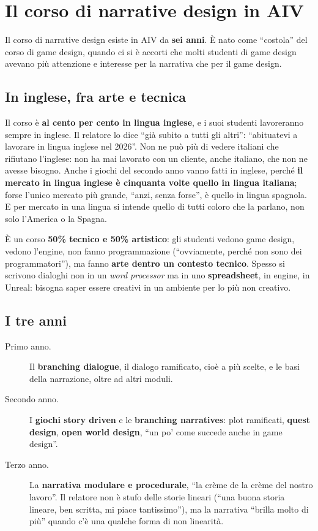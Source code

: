 \section{Il corso di narrative design in AIV}
\label{p3:sec:corso}

Il corso di narrative design esiste in AIV da \textbf{sei anni}. È nato come
``costola'' del corso di game design, quando ci si è accorti che molti
studenti di game design avevano più attenzione e interesse per la narrativa
che per il game design.

\subsection{In inglese, fra arte e tecnica}

Il corso è \textbf{al cento per cento in lingua inglese}, e i suoi studenti
lavoreranno sempre in inglese. Il relatore lo dice ``già subito a tutti gli
altri'': ``abituatevi a lavorare in lingua inglese nel 2026''. Non ne può più
di vedere italiani che rifiutano l'inglese: non ha mai lavorato con un
cliente, anche italiano, che non ne avesse bisogno. Anche i giochi del
secondo anno vanno fatti in inglese, perché \textbf{il mercato in lingua
inglese è cinquanta volte quello in lingua italiana}; forse l'unico mercato
più grande, ``anzi, senza forse'', è quello in lingua spagnola. E per mercato
in una lingua si intende quello di tutti coloro che la parlano, non solo
l'America o la Spagna.

È un corso \textbf{50\% tecnico e 50\% artistico}: gli studenti vedono game
design, vedono l'engine, non fanno programmazione (``ovviamente, perché non
sono dei programmatori''), ma fanno \textbf{arte dentro un contesto tecnico}.
Spesso si scrivono dialoghi non in un \emph{word processor} ma in uno
\textbf{spreadsheet}, in engine, in Unreal: bisogna saper essere creativi in
un ambiente per lo più non creativo.

\subsection{I tre anni}

\begin{description}
  \item[Primo anno.] Il \textbf{branching dialogue}, il dialogo ramificato,
        cioè a più scelte, e le basi della narrazione, oltre ad altri
        moduli.
  \item[Secondo anno.] I \textbf{giochi story driven} e le \textbf{branching
        narratives}: plot ramificati, \textbf{quest design}, \textbf{open
        world design}, ``un po' come succede anche in game design''.
  \item[Terzo anno.] La \textbf{narrativa modulare e procedurale}, ``la crème
        de la crème del nostro lavoro''. Il relatore non è stufo delle storie
        lineari (``una buona storia lineare, ben scritta, mi piace
        tantissimo''), ma la narrativa ``brilla molto di più'' quando c'è una
        qualche forma di non linearità.
\end{description}

